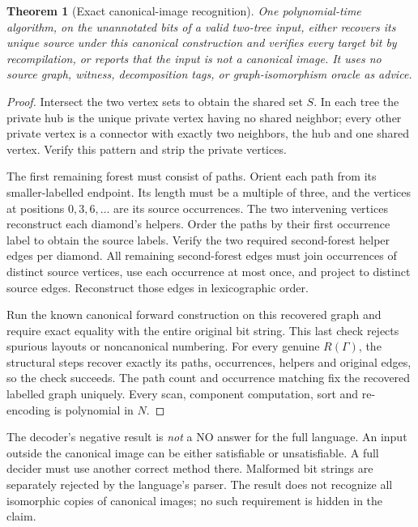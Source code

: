 \documentclass[11pt]{article}
\newtheorem{theorem}{Theorem}
\begin{document}
\begin{theorem}[Exact canonical-image recognition]\label{thm:decoder}
One polynomial-time algorithm, on the unannotated bits of a valid two-tree
input, either recovers its unique source under this canonical construction
and verifies every target bit by recompilation, or reports that the input is
not a canonical image. It uses no source graph, witness, decomposition tags,
or graph-isomorphism oracle as advice.
\end{theorem}
\begin{proof}
Intersect the two vertex sets to obtain the shared set $S$. In each tree the
private hub is the unique private vertex having no shared neighbor; every
other private vertex is a connector with exactly two neighbors, the hub and
one shared vertex. Verify this pattern and strip the private vertices.

The first remaining forest must consist of paths. Orient each path from its
smaller-labelled endpoint. Its length must be a multiple of three, and the
vertices at positions $0,3,6,\ldots$ are its source occurrences. The two
intervening vertices reconstruct each diamond's helpers. Order the paths by
their first occurrence label to obtain the source labels. Verify the two
required second-forest helper edges per diamond. All remaining second-forest
edges must join occurrences of distinct source vertices, use each occurrence
at most once, and project to distinct source edges. Reconstruct those edges
in lexicographic order.

Run the known canonical forward construction on this recovered graph and
require exact equality with the entire original bit string. This last check
rejects spurious layouts or noncanonical numbering. For every genuine
$R(\Gamma)$, the structural steps recover exactly its paths, occurrences,
helpers and original edges, so the check succeeds. The path count and
occurrence matching fix the recovered labelled graph uniquely. Every scan,
component computation, sort and re-encoding is polynomial in $N$.
\end{proof}

The decoder's negative result is \emph{not} a NO answer for the full language.
An input outside the canonical image can be either satisfiable or
unsatisfiable. A full decider must use another correct method there. Malformed
bit strings are separately rejected by the language's parser. The result does
not recognize all isomorphic copies of canonical images; no such requirement
is hidden in the claim.
\end{document}
